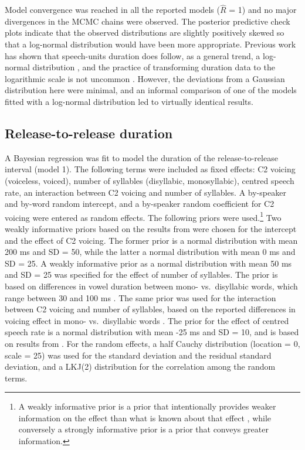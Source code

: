 \documentclass[12pt,a4paper,]{article}
\begin{document}
Model convergence was reached in all the reported models (\(\hat{R}\) =
1) and no major divergences in the MCMC chains were observed. The
posterior predictive check plots indicate that the observed
distributions are slightly positively skewed so that a log-normal
distribution would have been more appropriate. Previous work has shown
that speech-units duration does follow, as a general trend, a log-normal
distribution \citep{rosen2005, ratnikova2017}, and the practice of
transforming duration data to the logarithmic scale is not uncommon
\citep{gahl2019}. However, the deviations from a Gaussian distribution
here were minimal, and an informal comparison of one of the models
fitted with a log-normal distribution led to virtually identical
results.

\hypertarget{release-to-release-duration}{%
\subsection{Release-to-release
duration}\label{release-to-release-duration}}

\label{s:rr}

A Bayesian regression was fit to model the duration of the
release-to-release interval (model 1). The following terms were included
as fixed effects: C2 voicing (voiceless, voiced), number of syllables
(disyllabic, monosyllabic), centred speech rate, an interaction between
C2 voicing and number of syllables. A by-speaker and by-word random
intercept, and a by-speaker random coefficient for C2 voicing were
entered as random effects. The following priors were
used.\footnote{A weakly informative prior is a prior that intentionally provides weaker information on the effect than what is known about that effect \citep{gelman2006a}, while conversely a strongly informative prior is a prior that conveys greater information.}
Two weakly informative priors based on the results from
\citet{coretta2019k} were chosen for the intercept and the effect of C2
voicing. The former prior is a normal distribution with mean 200 ms and
SD = 50, while the latter a normal distribution with mean 0 ms and SD =
25. A weakly informative prior as a normal distribution with mean 50 ms
and SD = 25 was specified for the effect of number of syllables. The
prior is based on differences in vowel duration between mono-
vs.~disyllabic words, which range between 30 and 100 ms
\citep{sharf1962, klatt1973}. The same prior was used for the
interaction between C2 voicing and number of syllables, based on the
reported differences in voicing effect in mono- vs.~disyllabic words
\citep{sharf1962, klatt1973}. The prior for the effect of centred speech
rate is a normal distribution with mean -25 ms and SD = 10, and is based
on results from \citet{coretta2019k}. For the random effects, a half
Cauchy distribution (location = 0, scale = 25) was used for the standard
deviation and the residual standard deviation, and a LKJ(2) distribution
for the correlation among the random terms.
\end{document}
